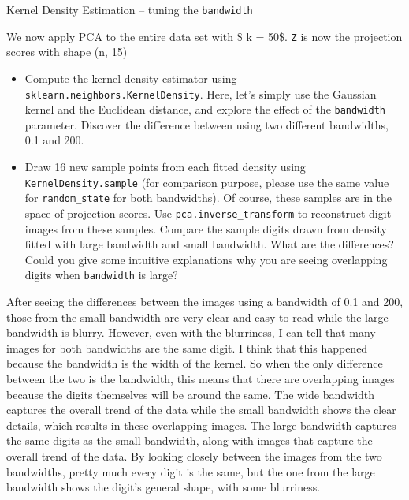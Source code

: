 \documentclass[11pt]{article}
\begin{document}
    Kernel Density Estimation -- tuning the \texttt{bandwidth}

We now apply PCA to the entire data set with \$ k = 50\$. \texttt{Z} is
now the projection scores with shape (n, 15)

\begin{itemize}
\item
  Compute the kernel density estimator using
  \texttt{sklearn.neighbors.KernelDensity}. Here, let's simply use the
  Gaussian kernel and the Euclidean distance, and explore the effect of
  the \texttt{bandwidth} parameter. Discover the difference between
  using two different bandwidths, 0.1 and 200.
\item
  Draw 16 new sample points from each fitted density using
  \texttt{KernelDensity.sample} (for comparison purpose, please use the
  same value for \texttt{random\_state} for both bandwidths). Of course,
  these samples are in the space of projection scores. Use
  \texttt{pca.inverse\_transform} to reconstruct digit images from these
  samples. Compare the sample digits drawn from density fitted with
  large bandwidth and small bandwidth. What are the differences? Could
  you give some intuitive explanations why you are seeing overlapping
  digits when \texttt{bandwidth} is large?
\end{itemize}

    After seeing the differences between the images using a bandwidth of 0.1
and 200, those from the small bandwidth are very clear and easy to read
while the large bandwidth is blurry. However, even with the blurriness,
I can tell that many images for both bandwidths are the same digit. I
think that this happened because the bandwidth is the width of the
kernel. So when the only difference between the two is the bandwidth,
this means that there are overlapping images because the digits
themselves will be around the same. The wide bandwidth captures the
overall trend of the data while the small bandwidth shows the clear
details, which results in these overlapping images. The large bandwidth
captures the same digits as the small bandwidth, along with images that
capture the overall trend of the data. By looking closely between the
images from the two bandwidths, pretty much every digit is the same, but
the one from the large bandwidth shows the digit's general shape, with
some blurriness.
\end{document}

